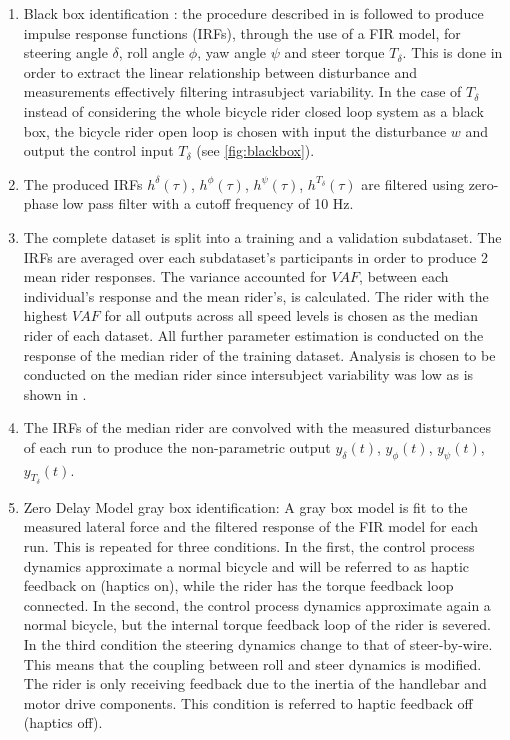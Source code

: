 \begin{enumerate}
    \item Black box identification : the procedure described in \cite{dialynaseffect} is followed to produce impulse response functions (IRFs), through the use of a FIR model, for steering angle \ensuremath{\delta}, roll angle \ensuremath{\phi}, yaw angle \ensuremath{\psi} and steer torque  \ensuremath{T_\delta}. This is done in order to extract the linear relationship between disturbance and measurements effectively filtering intrasubject variability. In the case of \ensuremath{T_\delta} instead of considering the whole bicycle rider closed loop system as a black box, the bicycle rider open loop is chosen with input the disturbance \ensuremath{w} and output the control input \ensuremath{T_\delta} (see \cref{fig:blackbox}).
    \item The produced IRFs \ensuremath{h^\delta(\tau)}, \ensuremath{h^\phi(\tau)}, \ensuremath{h^\psi(\tau)}, \ensuremath{h^{T_\delta}(\tau)} are filtered using zero-phase low pass filter with a cutoff frequency of 10 \si{\hertz}.
    \item The complete dataset is split into a training and a validation subdataset. The IRFs are averaged over each subdataset's participants in order to produce 2 mean rider responses. The variance accounted for \ensuremath{\mathit{VAF}}, between each individual's  response and the mean rider's, is calculated. The rider with the highest  \ensuremath{\mathit{VAF}} for all outputs  across all speed levels  is chosen as the median rider of each dataset. All further parameter estimation is conducted on the response of the median rider of the training dataset. Analysis is chosen to be conducted on the median rider since intersubject variability was low as is shown in \cite{dialynaseffect}.
    \item The IRFs of the median rider are convolved with the measured disturbances of each run to produce the non-parametric output \ensuremath{y_\delta(t)}, \ensuremath{y_\phi(t)}, \ensuremath{y_\psi(t)}, \ensuremath{y_{T_\delta}(t)}.
    \item Zero Delay Model gray box identification: A gray box model  is fit to the measured lateral force and the filtered response of the FIR
    model for each run. This is repeated for three conditions. In the first, the control process dynamics approximate a normal bicycle and will be referred to as haptic feedback on (haptics on), while  the rider has the torque feedback loop connected. In the second, the control process dynamics approximate again a normal bicycle, but the internal torque feedback loop of the rider is severed. In the third condition the steering dynamics change to that of steer-by-wire. This means that the coupling between roll and steer dynamics is modified. The rider is only receiving feedback due to the inertia of the handlebar and motor drive components. This condition is referred to haptic feedback off (haptics off).

\end{enumerate}
